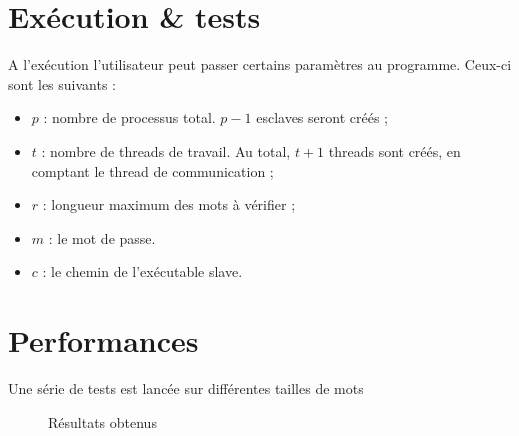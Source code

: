 \section{Exécution \& tests} %
\label{sec:execution}

A l'exécution l'utilisateur peut passer certains paramètres au programme. Ceux-ci sont les suivants :
\begin{itemize}
	\item $p$ : nombre de processus total. $p-1$ esclaves seront créés ;
	\item $t$ : nombre de threads de travail. Au total, $t+1$ threads sont créés, en comptant le thread de communication ;
	\item $r$ : longueur maximum des mots à vérifier ;
	\item $m$ : le mot de passe.
	\item $c$ : le chemin de l'exécutable \og slave\fg .
\end{itemize}


\section{Performances} %
\label{sec:perf}

Une série de tests est lancée sur différentes tailles de mots

\begin{figure}[h!]
\centering
\caption{Résultats obtenus}
\label{fig:stats}
\end{figure}

